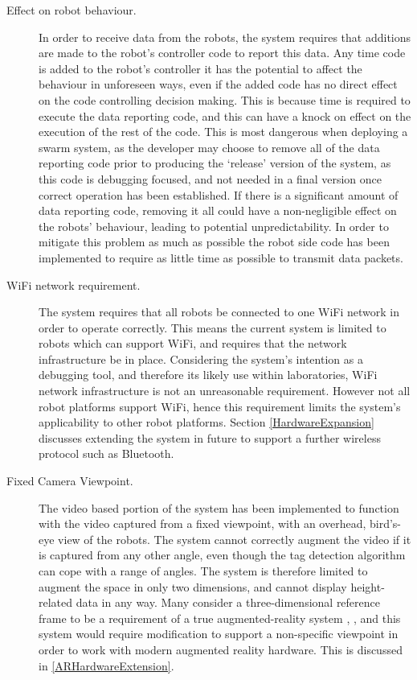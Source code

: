 \begin{description}
 \item [Effect on robot behaviour.] In order to receive data from the robots, the system requires that   additions are made to the robot's controller code to report this data. Any time code is added to the robot's controller it has the potential to affect the behaviour in unforeseen ways, even if the added code has no direct effect on the code controlling decision making. This is because time is required to execute the data reporting code, and this can have a knock on effect on the execution of the rest of the code. This is most dangerous when deploying a swarm system, as the developer may choose to remove all of the data reporting code prior to producing the `release' version of the system, as this code is debugging focused, and not needed in a final version once correct operation has been established. If there is a significant amount of data reporting code, removing it all could have a non-negligible effect on the robots' behaviour, leading to potential unpredictability. In order to mitigate this problem as much as possible the robot side code has been implemented to require as little time as possible to transmit data packets.
 
\item [WiFi network requirement.] The system requires that all robots be connected to one WiFi network in order to operate correctly. This means the current system is limited to robots which can support WiFi, and requires that the network infrastructure be in place. Considering the system's intention as a debugging tool, and therefore its likely use within laboratories, WiFi network infrastructure is not an unreasonable requirement. However not all robot platforms support WiFi, hence this requirement limits the system's applicability to other robot platforms. Section \ref{HardwareExpansion} discusses extending the system in future to support a further wireless protocol such as Bluetooth.

\item [Fixed Camera Viewpoint.] The video based portion of the system has been implemented to function with the video captured from a fixed viewpoint, with an overhead, bird's-eye view of the robots. The system cannot correctly augment the video if it is captured from any other angle, even though the tag detection algorithm can cope with a range of angles. The system is therefore limited to augment the space in only two dimensions, and cannot display height-related data in any way. Many consider a three-dimensional reference frame to be a requirement of a true augmented-reality system \cite{Azuma:1997}, \cite{Billinghurst:2014}, and this system would require modification to support a non-specific viewpoint in order to work with modern augmented reality hardware. This is discussed in \ref{ARHardwareExtension}.
\end{description}

